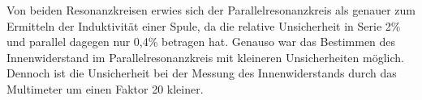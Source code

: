 \documentclass[
	a4paper,
	12pt,
	pagesize,
	ngerman
]{scrartcl}
\begin{document}
	Von beiden Resonanzkreisen erwies sich der Parallelresonanzkreis als genauer zum Ermitteln der Induktivität einer Spule, da die relative Unsicherheit in Serie 2\% und parallel dagegen nur 0,4\% betragen hat.
	Genauso war das Bestimmen des Innenwiderstand im Parallelresonanzkreis mit kleineren Unsicherheiten möglich.
	Dennoch ist die Unsicherheit bei der Messung des Innenwiderstands durch das Multimeter um einen Faktor 20 kleiner.
	
	
	\printbibliography
\end{document}
